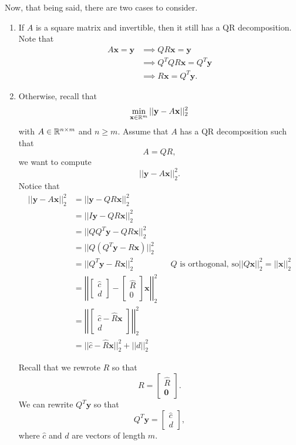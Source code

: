 \documentclass[letterpaper]{article}
\newcommand{\0}{\mathbf{0}}
\newcommand{\y}{\mathbf{y}}
\newcommand{\x}{\mathbf{x}}
\begin{document}
\bigskip 

Now, that being said, there are two cases to consider. 
\begin{enumerate}
    \item If $A$ is a square matrix and invertible, then it still has a QR decomposition. Note that 
    \begin{equation*}
        \begin{aligned}
            A\x = \y &\implies QR\x = \y \\ 
                &\implies Q^T Q R \x = Q^T \y \\ 
                &\implies R\x = Q^T \y. 
        \end{aligned}
    \end{equation*}

    \item Otherwise, recall that \[\min_{\x \in \R^m} ||\y - A\x||_{2}^{2}\] with $A \in \mathbb{R}^{n \times m}$ and $n \geq m$. Assume that $A$ has a QR decomposition such that \[A = QR,\] we want to compute \[||\y - A\x||_{2}^{2}.\] Notice that
    \begin{equation*}
        \begin{aligned}
            ||\y - A\x||_2^2 &= ||\y - QR\x||_2^2 \\ 
                &= ||I\y - QR\x||_2^2 \\ 
                &= ||QQ^T \y - QR\x||_2^2 \\ 
                &= ||Q(Q^T \y - R\x)||_2^2 \\ 
                &= ||Q^T \y - R\x||_2^2 && Q \text{ is orthogonal, so} ||Q\x||_2^2 = ||\x||_2^2 \\ 
                &= \left|\left| \begin{bmatrix}
                    \hat{c} \\ d
                \end{bmatrix} - \begin{bmatrix}
                    \hat{R} \\ 0
                \end{bmatrix} \x \right|\right|_2^2 \\ 
                &= \left|\left| \begin{bmatrix}
                    \hat{c} - \hat{R}\x \\ 
                    d 
                \end{bmatrix} \right|\right|_2^2 \\ 
                &= ||\hat{c} - \hat{R}\x||_2^2 + ||d||_2^2
        \end{aligned}
    \end{equation*}

    Recall that we rewrote $R$ so that \[R = \begin{bmatrix}
        \hat{R} \\ \0
    \end{bmatrix}.\] We can rewrite $Q^T \y$ so that \[Q^T \y = \begin{bmatrix}
        \hat{c} \\ d
    \end{bmatrix},\] where $\hat{c}$ and $d$ are vectors of length $m$.  
\end{enumerate}
\end{document}
